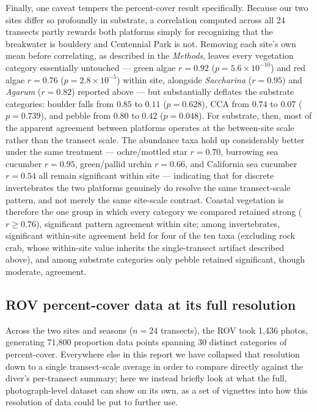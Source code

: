 \documentclass[11pt]{article}
\begin{document}
Finally, one caveat tempers the percent-cover result specifically.
Because our two sites differ so profoundly in substrate, a correlation
computed across all 24 transects partly rewards both platforms simply for
recognizing that the breakwater is bouldery and Centennial Park is not.
Removing each site's own mean before correlating, as described in the
\textit{Methods}, leaves every vegetation category essentially
untouched --- green algae $r=0.92$ ($p=5.6\times10^{-10}$) and red algae
$r=0.76$ ($p=2.8\times10^{-5}$) within site, alongside \textit{Saccharina}
($r=0.95$) and \textit{Agarum} ($r=0.82$) reported above --- but substantially
deflates the
substrate categories: boulder falls from $0.85$ to $0.11$ ($p=0.628$), CCA
from $0.74$ to $0.07$ ($p=0.739$), and pebble from $0.80$ to $0.42$
($p=0.048$).
For substrate, then, most of the apparent agreement between platforms operates
at the between-site scale rather than the transect scale.
The abundance taxa hold up considerably better under the same treatment ---
ochre/mottled star $r=0.70$, burrowing sea cucumber $r=0.95$, green/pallid
urchin $r=0.66$, and California sea cucumber $r=0.54$ all remain significant
within site --- indicating that for discrete invertebrates the two platforms
genuinely do resolve the same transect-scale pattern, and not merely the same
site-scale contrast.
Coastal vegetation is therefore the one group in which every category we
compared retained strong ($r \geq 0.76$), significant pattern agreement within
site; among invertebrates, significant within-site agreement held for four of
the ten taxa (excluding rock crab, whose within-site value inherits the
single-transect artifact described above), and among substrate categories
only pebble retained significant, though moderate, agreement.

\subsection{ROV percent-cover data at its full resolution}
\label{subsec:ROV_fullres}


Across the two sites and seasons ($n=24$ transects), the ROV took 1,436
photos, generating 71,800 proportion data points spanning 30 distinct
categories of percent-cover.
Everywhere else in this report we have collapsed that resolution down to a
single transect-scale average in order to compare directly against the
diver's per-transect summary; here we instead briefly look at what the full,
photograph-level dataset can show on its own, as a set of vignettes into how
this resolution of data could be put to further use.
\end{document}
